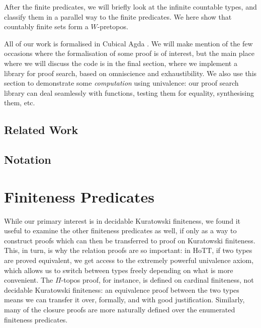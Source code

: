 After the finite predicates, we will briefly look at the infinite countable
types, and classify them in a parallel way to the finite predicates.
We here show that countably finite sets form a \(W\)-pretopos.

All of our work is formalised in Cubical Agda
\cite{vezzosiCubicalAgdaDependently2019}.
We will make mention of the few occasions where the formalisation of some proof
is of interest, but the main place where we will discuss the code is in the
final section, where we implement a library for proof search, based on
omniscience and exhaustibility.
We also use this section to demonstrate some \emph{computation} using
univalence: our proof search library can deal seamlessly with functions, testing
them for equality, synthesising them, etc.
\subsection{Related Work}
\subsection{Notation}
\section{Finiteness Predicates}
While our primary interest is in decidable Kuratowski finiteness, we found it
useful to examine the other finiteness predicates as well, if only as a way to
construct proofs which can then be transferred to proof on Kuratowski
finiteness.
This, in turn, is why the relation proofs are so important: in HoTT, if two
types are proved equivalent, we get access to the extremely powerful univalence
axiom, which allows us to switch between types freely depending on what is more
convenient.
The \(\Pi\)-topos proof, for instance, is defined on cardinal finiteness, not
decidable Kuratowski finiteness: an equivalence proof between the two types
means we can transfer it over, formally, and with good justification.
Similarly, many of the closure proofs are more naturally defined over the
enumerated finiteness predicates.
